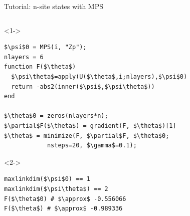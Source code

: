 \begin{frame}[fragile]{Tutorial: n-site states with MPS}

\begin{columns}

\begin{column}{5.5cm}

\begin{onlyenv}<1->
\begin{lstlisting}[language=JuliaLocal, style=julia, mathescape, basicstyle=\scriptsize\ttfamily]
$\psi$0 = MPS(i, "Zp");
nlayers = 6
function F($\theta$)
  $\psi\theta$=apply(U($\theta$,i;nlayers),$\psi$0)
  return -abs2(inner($\psi$,$\psi\theta$))
end

$\theta$0 = zeros(nlayers*n);
$\partial$F($\theta$) = gradient(F, $\theta$)[1]
$\theta$ = minimize(F, $\partial$F, $\theta$0;
            nsteps=20, $\gamma$=0.1);
\end{lstlisting}
\end{onlyenv}


\begin{onlyenv}<2->
\begin{lstlisting}[language=JuliaLocal, style=julia, mathescape, basicstyle=\scriptsize\ttfamily]
maxlinkdim($\psi$0) == 1
maxlinkdim($\psi\theta$) == 2
F($\theta$0) # $\approx$ -0.556066
F($\theta$) # $\approx$ -0.989336
\end{lstlisting}
\end{onlyenv}

\end{column}

\begin{column}{4.5cm}



\end{column}
\end{columns}
\end{frame}
